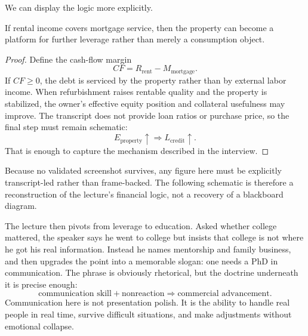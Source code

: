 We can display the logic more explicitly.

\begin{proposition}
If rental income covers mortgage service, then the property can become a platform for further leverage rather than merely a consumption object.
\end{proposition}

\begin{proof}
Define the cash-flow margin
\begin{equation}
CF = R_{\text{rent}} - M_{\text{mortgage}}.
\end{equation}
If \(CF \ge 0\), the debt is serviced by the property rather than by external labor income. When refurbishment raises rentable quality and the property is stabilized, the owner's effective equity position and collateral usefulness may improve. The transcript does not provide loan ratios or purchase price, so the final step must remain schematic:
\[
E_{\text{property}} \uparrow \Rightarrow L_{\text{credit}} \uparrow.
\]
That is enough to capture the mechanism described in the interview.
\end{proof}

Because no validated screenshot survives, any figure here must be explicitly transcript-led rather than frame-backed. The following schematic is therefore a reconstruction of the lecture's financial logic, not a recovery of a blackboard diagram.

\begin{figure}[h]
\centering
{}
\end{figure}

The lecture then pivots from leverage to education. Asked whether college mattered, the speaker says he went to college but insists that college is not where he got his real information. Instead he names mentorship and family business, and then upgrades the point into a memorable slogan: one needs a PhD in communication. The phrase is obviously rhetorical, but the doctrine underneath it is precise enough:
\begin{equation}
\text{communication skill} + \text{nonreaction} \Rightarrow \text{commercial advancement}.
\end{equation}
Communication here is not presentation polish. It is the ability to handle real people in real time, survive difficult situations, and make adjustments without emotional collapse.

